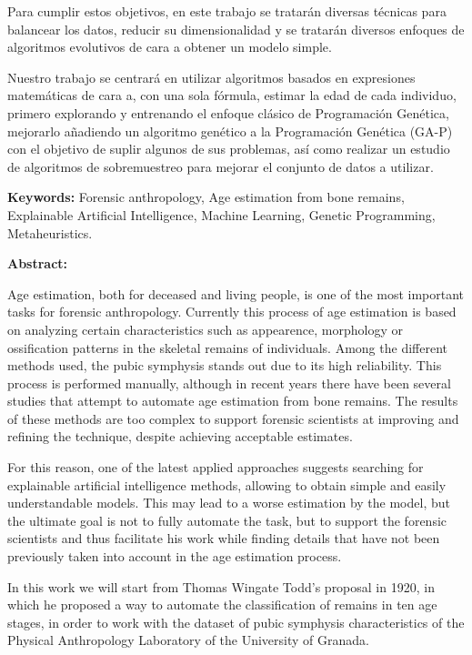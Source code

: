 Para cumplir estos objetivos, en este trabajo se tratarán diversas técnicas para balancear los datos, reducir su dimensionalidad y se tratarán diversos enfoques de algoritmos evolutivos de cara a obtener un modelo simple.

Nuestro trabajo se centrará en utilizar algoritmos basados en expresiones matemáticas de cara a, con una sola fórmula, estimar la edad de cada individuo, primero explorando y entrenando el enfoque clásico de Programación Genética, mejorarlo añadiendo un algoritmo genético a la Programación Genética (GA-P) con el objetivo de suplir algunos de sus problemas, así como realizar un estudio de algoritmos de sobremuestreo para mejorar el conjunto de datos a utilizar.

\newpage


\begin{center}
	{\large\textbf{\thetitleEN}}


	\theauthor
\end{center}

\textbf{Keywords:} Forensic anthropology, Age estimation from bone remains, Explainable Artificial Intelligence,
Machine Learning, Genetic Programming, Metaheuristics.

\textbf{Abstract:}

Age estimation, both for deceased and living people, is one of the most important tasks for forensic anthropology. Currently this process of age estimation is based on analyzing certain characteristics such as appearence, morphology or ossification patterns in the skeletal remains of individuals. Among the different methods used, the pubic symphysis stands out due to its high reliability. This process is performed manually, although in recent years there have been several studies that attempt to automate age estimation from bone remains. The results of these methods are too complex to support forensic scientists at improving and refining the technique, despite achieving acceptable estimates.

For this reason, one of the latest applied approaches suggests searching for explainable artificial intelligence methods, allowing to obtain simple and easily understandable models. This may lead to a worse estimation by the model, but the ultimate goal is not to fully automate the task, but to support the forensic scientists and thus facilitate his work while finding details that have not been previously taken into account in the age estimation process.

In this work we will start from Thomas Wingate Todd's proposal in 1920, in which he proposed a way to automate the classification of remains in ten age stages, in order to work with the dataset of pubic symphysis characteristics of the Physical Anthropology Laboratory of the University of Granada.

